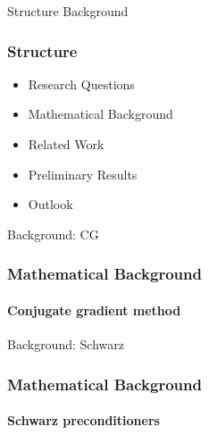 \begin{frame}[label=background]{Structure Background}
    \frametitle{Structure}
    \begin{itemize}
        \item Research Questions
        \item {\color{tud grapefruit}Mathematical Background}
        \item Related Work
        \item Preliminary Results
        \item Outlook
    \end{itemize}
\end{frame}

\begin{frame}[label=background]{Background: CG}
    \frametitle{Mathematical Background}
    \framesubtitle{Conjugate gradient method}
\end{frame}

\begin{frame}[label=background]{Background: Schwarz}
    \frametitle{Mathematical Background}
    \framesubtitle{Schwarz preconditioners}
\end{frame}